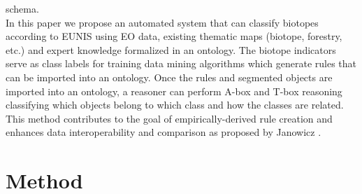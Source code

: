 \documentclass[authoryear, review,12pt,number]{elsarticle}
\begin{document}
schema.\\
In this paper we propose an automated system that can classify
biotopes according to EUNIS using EO data, existing thematic 
maps (biotope, forestry, etc.) and expert knowledge formalized in an ontology.
The biotope indicators serve as class labels for training data mining
algorithms which generate rules that can be imported into an ontology. Once the
rules and segmented objects are imported into an ontology, a reasoner can
perform A-box and T-box reasoning classifying which objects belong to which
class and how the classes are related. This method contributes to the goal of
empirically-derived rule creation and enhances data interoperability and
comparison as proposed by Janowicz \citep{Janowicz2012}.
\section{Method}
\end{document}
